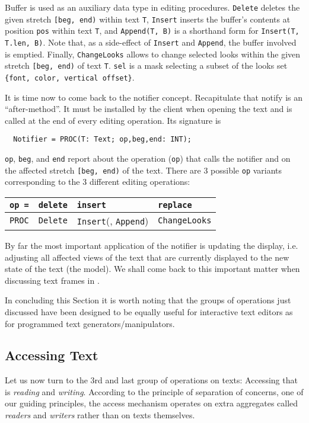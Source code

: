 Buffer is used as an auxiliary data type in editing procedures.
\verb|Delete| deletes the given stretch \verb|[beg, end)| within text \verb|T|,
\verb|Insert| inserts the buffer's contents at position \verb|pos| within text \verb|T|, and
\verb|Append(T, B)| is a shorthand form for \verb|Insert(T, T.len, B)|.
Note that, as a side-effect of \verb|Insert| and \verb|Append|, the buffer involved is emptied.
Finally, \verb|ChangeLooks| allows to change selected looks
within the given stretch \verb|[beg, end)| of text \verb|T|.
\verb|sel| is a mask selecting a subset of the looks set \verb|{font, color, vertical offset}|.

It is time now to come back to the notifier concept.
Recapitulate that notify is an “after-method”.
It must be installed by the client when opening the text
and is called at the end of every editing operation.  Its signature is
\begin{verbatim}
  Notifier = PROC(T: Text; op,beg,end: INT);
\end{verbatim}
\verb|op|, \verb|beg|, and \verb|end| report about the operation (\verb|op|) that calls the notifier
and on the affected stretch \verb|[beg, end)| of the text.
There are 3 possible \verb|op| variants corresponding to the 3 different editing operations:
\begin{table}[h!]
  \centering
  \begin{tabular}{r|l|l|l}
    \verb|op =| & \verb|delete| & \verb|insert| & \verb|replace| \\\hline
    \verb|PROC| & \verb|Delete| & \verb|Insert|(, \verb|Append|) & \verb|ChangeLooks|
  \end{tabular}
\end{table}

By far the most important application of the notifier is updating the display,
i.e. adjusting all affected views of the text
that are currently displayed to the new state of the text (the model).
We shall come back to this important matter when discussing text frames in \label{sec:textframes}.

In concluding this Section it is worth noting that
the groups of operations just discussed have been designed to be equally useful
for interactive text editors as for programmed text generators/manipulators.

\subsection{Accessing Text}
Let us now turn to the 3rd and last group of operations on texts:
Accessing that is \emph{reading} and \emph{writing}.
According to the principle of separation of concerns, one of our guiding principles,
the access mechanism operates on extra aggregates called \emph{readers} and \emph{writers}
rather than on texts themselves.


